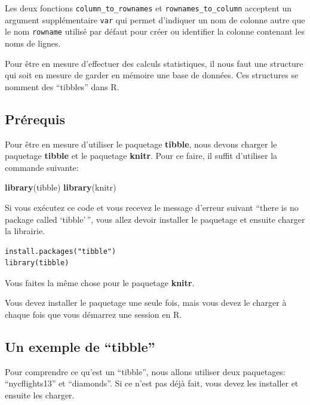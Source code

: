 \documentclass[]{book}
\newenvironment{Shaded}{\begin{snugshade}}{\end{snugshade}}
\newcommand{\KeywordTok}[1]{\textcolor[rgb]{0.13,0.29,0.53}{\textbf{#1}}}
\newcommand{\NormalTok}[1]{#1}
\theoremstyle{definition}
\theoremstyle{definition}
\theoremstyle{definition}
\theoremstyle{remark}
\begin{document}
Les deux fonctions \texttt{column\_to\_rownames} et
\texttt{rownames\_to\_column} acceptent un argument supplémentaire
\texttt{var} qui permet d'indiquer un nom de colonne autre que le nom
\texttt{rowname} utilisé par défaut pour créer ou identifier la colonne
contenant les noms de lignes.

Pour être en mesure d'effectuer des calculs statistiques, il nous faut
une structure qui soit en mesure de garder en mémoire une base de
données. Ces structures se nomment des ``tibbles'' dans R.

\hypertarget{prerequis}{%
\subsection{Prérequis}\label{prerequis}}

Pour être en mesure d'utiliser le paquetage \textbf{tibble}, nous devons
charger le paquetage \textbf{tibble} et le paquetage \textbf{knitr}.
Pour ce faire, il suffit d'utiliser la commande suivante:

\begin{Shaded}
\begin{Highlighting}[]
\KeywordTok{library}\NormalTok{(tibble)}
\KeywordTok{library}\NormalTok{(knitr)}
\end{Highlighting}
\end{Shaded}

Si vous exécutez ce code et vous recevez le message d'erreur suivant
``there is no package called `tibble'\,'', vous allez devoir installer
le paquetage et ensuite charger la librairie.

\begin{verbatim}
install.packages("tibble")
library(tibble)
\end{verbatim}

Vous faites la même chose pour le paquetage \textbf{knitr}.

Vous devez installer le paquetage une seule fois, mais vous devez le
charger à chaque fois que vous démarrez une session en R.

\hypertarget{un-exemple-de-tibble}{%
\subsection{Un exemple de ``tibble''}\label{un-exemple-de-tibble}}

Pour comprendre ce qu'est un ``tibble'', nous allons utiliser deux
paquetages: ``nycflights13'' et ``diamonds''. Si ce n'est pas déjà fait,
vous devez les installer et ensuite les charger.
\end{document}
